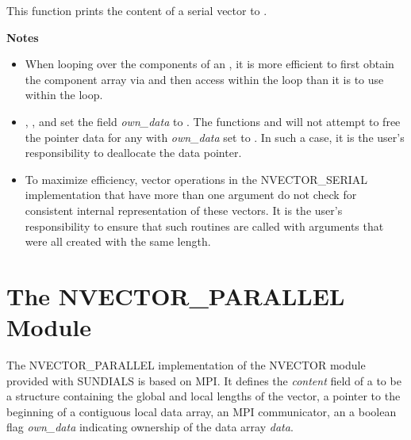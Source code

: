 \documentclass[letterpaper,10pt,english]{sphinxmanual}
\begin{document}
\begin{fulllineitems}
\label{nvectors/NVector_Serial:c.N_VPrint_Serial}
This function prints the content of a serial vector to .

\end{fulllineitems}


\textbf{Notes}
\begin{itemize}
\item {} 
When looping over the components of an , it is more
efficient to first obtain the component array via  and then access  within the loop than it
is to use  within the loop.

\item {} 
{\hyperref[nvectors/NVector_Serial:c.N_VNewEmpty_Serial]{\emph{}}}, {\hyperref[nvectors/NVector_Serial:c.N_VMake_Serial]{\emph{}}}, and
{\hyperref[nvectors/NVector_Serial:c.N_VCloneEmptyVectorArray_Serial]{\emph{}}} set the field \emph{own\_data}
to .  The functions  and
{\hyperref[nvectors/NVector_Serial:c.N_VDestroyVectorArray_Serial]{\emph{}}} will not attempt to free the
pointer data for any  with \emph{own\_data} set to .
In such a case, it is the user's responsibility to deallocate the
data pointer.

\item {} 
To maximize efficiency, vector operations in the NVECTOR\_SERIAL
implementation that have more than one  argument do not
check for consistent internal representation of these vectors. It is
the user's responsibility to ensure that such routines are called
with  arguments that were all created with the same
length.

\end{itemize}


\section{The NVECTOR\_PARALLEL Module}
\label{nvectors/NVector_Parallel:nvectors-nvparallel}\label{nvectors/NVector_Parallel:the-nvector-parallel-module}\label{nvectors/NVector_Parallel::doc}
The NVECTOR\_PARALLEL implementation of the NVECTOR module provided with
SUNDIALS is based on MPI.  It defines the \emph{content} field of a
 to be a structure containing the global and local lengths
of the vector, a pointer to the beginning of a contiguous local data
array, an MPI communicator, an a boolean flag \emph{own\_data} indicating
ownership of the data array \emph{data}.
\end{document}
